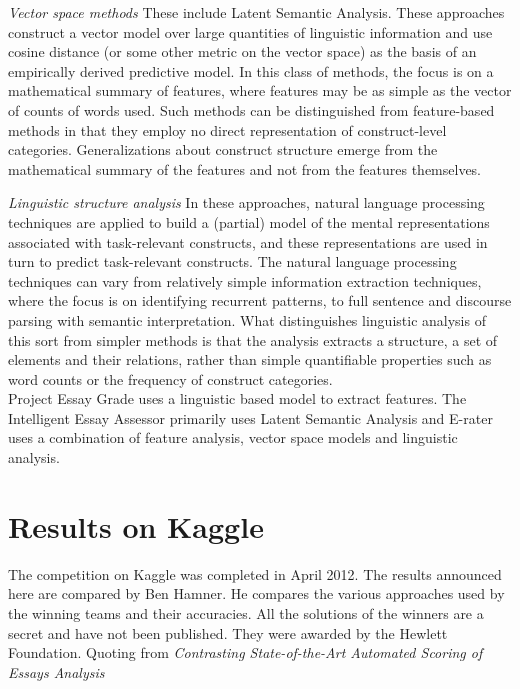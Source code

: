 \documentclass[BTech]{nitkdiss}
\begin{document}
\textit{Vector space methods} These include Latent Semantic Analysis. These approaches construct a vector model over large quantities of linguistic information and use cosine distance (or some other metric on the vector space) as the basis of an empirically derived predictive model. In this class of methods, the focus is on a mathematical summary of features, where features may be as simple as the vector of counts of words used. Such methods can be distinguished from feature-based methods in that they employ no direct representation of construct-level categories. Generalizations about construct structure emerge from the mathematical summary of the features and not from the features themselves.

\textit{Linguistic structure analysis} In these approaches, natural language processing techniques are applied to build a (partial) model of the mental representations associated with task-relevant constructs, and these representations are used in turn to predict task-relevant constructs. The natural language processing techniques can vary from relatively simple information extraction techniques, where the focus is on identifying recurrent patterns, to full sentence and discourse parsing with semantic interpretation. What distinguishes linguistic analysis of this sort from simpler methods is that the analysis extracts a structure, a set of elements and their relations, rather than simple quantifiable properties such as word counts or the frequency of
construct categories.\\

Project Essay Grade uses a linguistic based model to extract features. The Intelligent Essay Assessor primarily uses Latent Semantic Analysis and E-rater uses a combination of feature analysis, vector space models and linguistic analysis.

\section{Results on Kaggle}
The competition on Kaggle was completed in April 2012. The results announced here are compared by Ben Hamner. He compares the various approaches used by the winning teams and their accuracies. All the solutions of the winners are a secret and have not been published. They were awarded by the Hewlett Foundation. Quoting from \textit{Contrasting State-of-the-Art Automated Scoring of Essays Analysis}
\end{document}

